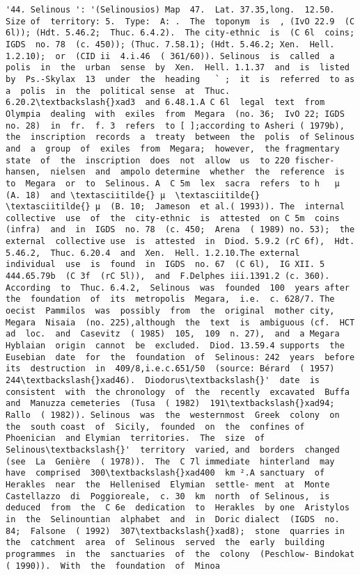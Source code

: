 \documentclass[11pt]{article}
\begin{document}
\begin{Verbatim}[commandchars=\\\{\}]
         '44. Selinous ': '(Selinousios) Map  47.  Lat. 37.35,long.  12.50. Size of  territory: 5.  Type:  A: .  The  toponym  is  , (IvO 22.9  (C 6l)); (Hdt. 5.46.2;  Thuc. 6.4.2).  The city-ethnic  is  (C 6l  coins;  IGDS  no. 78  (c. 450)); (Thuc. 7.58.1); (Hdt. 5.46.2; Xen.  Hell. 1.2.10);  or  (CID ii  4.i.46  ( 361/60)). Selinous  is  called  a  polis  in  the  urban  sense  by  Xen.  Hell. 1.1.37  and  is  listed  by  Ps.-Skylax  13  under  the  heading   ` ;  it  is  referred  to as  a  polis  in  the  political sense  at  Thuc. 6.20.2\textbackslash{}xad3  and 6.48.1.A C 6l  legal  text  from Olympia  dealing  with  exiles  from  Megara  (no. 36;  IvO 22; IGDS  no. 28)  in  fr.  f. 3  refers  to [ ];according to Asheri ( 1979b),  the  inscription  records  a  treaty  between  the  polis  of Selinous  and  a  group  of  exiles  from  Megara;  however,  the fragmentary  state  of  the  inscription  does  not  allow  us  to 220 fischer-hansen,  nielsen  and  ampolo determine  whether  the  reference  is  to  Megara  or  to  Selinous. A  C 5m  lex  sacra  refers  to h   µ  (A. 18)  and \textasciitilde{} µ  \textasciitilde{}   \textasciitilde{} µ  (B. 10;  Jameson  et al.( 1993)). The  internal  collective  use  of  the  city-ethnic  is  attested  on C 5m  coins  (infra)  and  in  IGDS  no. 78  (c. 450;  Arena  ( 1989) no. 53);  the  external  collective use  is  attested  in  Diod. 5.9.2 (rC 6f),  Hdt. 5.46.2,  Thuc. 6.20.4  and  Xen.  Hell. 1.2.10.The external  individual  use  is  found  in  IGDS  no. 67  (C 6l),  IG XII. 5  444.65.79b  (C 3f  (rC 5l)),  and  F.Delphes iii.1391.2 (c. 360). According  to  Thuc. 6.4.2,  Selinous  was  founded  100  years after  the  foundation  of  its  metropolis  Megara,  i.e.  c. 628/7. The  oecist  Pammilos  was  possibly  from  the  original  mother city,  Megara  Nisaia  (no. 225),although  the  text  is  ambiguous (cf.  HCT  ad  loc.  and  Casevitz  ( 1985)  105,  109  n. 27),  and  a Megara  Hyblaian  origin  cannot  be  excluded.  Diod. 13.59.4 supports  the  Eusebian  date  for  the  foundation  of  Selinous: 242  years  before  its  destruction  in  409/8,i.e.c.651/50  (source: Bérard  ( 1957)  244\textbackslash{}xad46).  Diodorus\textbackslash{}'  date  is  consistent  with  the chronology  of  the  recently  excavated  Buffa  and  Manuzza cemeteries  (Tusa  ( 1982)  191\textbackslash{}xad94;  Rallo  ( 1982)). Selinous  was  the  westernmost  Greek  colony  on  the  south coast  of  Sicily,  founded  on  the  confines of  Phoenician  and Elymian  territories.  The  size  of  Selinous\textbackslash{}'  territory  varied, and  borders  changed  (see  La  Genière  ( 1978)).  The  C 7l immediate  hinterland  may  have  comprised  300\textbackslash{}xad400  km ².A sanctuary  of  Herakles  near  the  Hellenised  Elymian  settle- ment  at  Monte  Castellazzo  di  Poggioreale,  c. 30  km  north  of Selinous,  is  deduced  from  the  C 6e  dedication  to  Herakles  by one  Aristylos  in  the  Selinountian  alphabet  and  in  Doric dialect  (IGDS  no. 84;  Falsone  ( 1992)  307\textbackslash{}xad8);  stone  quarries in  the  catchment  area  of  Selinous  served  the  early  building programmes  in  the  sanctuaries  of  the  colony  (Peschlow- Bindokat  ( 1990)).  With  the  foundation  of  Minoa  
\end{Verbatim}
\end{document}
